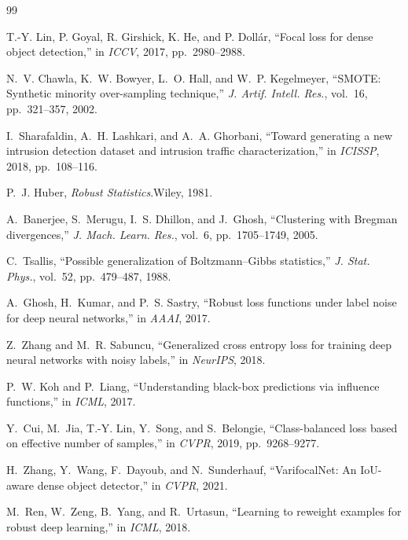 \documentclass[conference]{IEEEtran}
\theoremstyle{definition}
\begin{document}

\begin{thebibliography}{99}

 T.-Y. Lin, P. Goyal, R. Girshick, K. He, and P. Doll\'ar, ``Focal loss for dense object detection,'' in \emph{ICCV}, 2017, pp.~2980--2988.

 N.~V. Chawla, K.~W. Bowyer, L.~O. Hall, and W.~P. Kegelmeyer, ``SMOTE: Synthetic minority over-sampling technique,'' \emph{J. Artif. Intell. Res.}, vol.~16, pp.~321--357, 2002.

 I.~Sharafaldin, A.~H. Lashkari, and A.~A. Ghorbani, ``Toward generating a new intrusion detection dataset and intrusion traffic characterization,'' in \emph{ICISSP}, 2018, pp.~108--116.

 P.~J. Huber, \emph{Robust Statistics}.\quad Wiley, 1981.

 A.~Banerjee, S.~Merugu, I.~S. Dhillon, and J.~Ghosh, ``Clustering with Bregman divergences,'' \emph{J. Mach. Learn. Res.}, vol.~6, pp.~1705--1749, 2005.

 C.~Tsallis, ``Possible generalization of Boltzmann--Gibbs statistics,'' \emph{J. Stat. Phys.}, vol.~52, pp.~479--487, 1988.

 A.~Ghosh, H.~Kumar, and P.~S. Sastry, ``Robust loss functions under label noise for deep neural networks,'' in \emph{AAAI}, 2017.

 Z.~Zhang and M.~R. Sabuncu, ``Generalized cross entropy loss for training deep neural networks with noisy labels,'' in \emph{NeurIPS}, 2018.

 P.~W. Koh and P.~Liang, ``Understanding black-box predictions via influence functions,'' in \emph{ICML}, 2017.

 Y.~Cui, M.~Jia, T.-Y. Lin, Y.~Song, and S.~Belongie, ``Class-balanced loss based on effective number of samples,'' in \emph{CVPR}, 2019, pp.~9268--9277.

 H.~Zhang, Y.~Wang, F.~Dayoub, and N.~Sunderhauf, ``VarifocalNet: An IoU-aware dense object detector,'' in \emph{CVPR}, 2021.

 M.~Ren, W.~Zeng, B.~Yang, and R.~Urtasun, ``Learning to reweight examples for robust deep learning,'' in \emph{ICML}, 2018.


\end{thebibliography}
\end{document}
